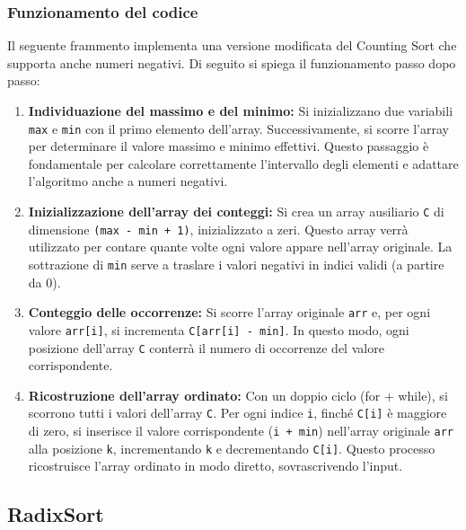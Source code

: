 \documentclass[a4paper, 11pt]{article}
\begin{document}
\subsubsection*{Funzionamento del codice}

Il seguente frammento implementa una versione modificata del Counting Sort che supporta anche numeri negativi. Di seguito si spiega il funzionamento passo dopo passo:

\begin{enumerate}
  \item \textbf{Individuazione del massimo e del minimo:}  
  Si inizializzano due variabili \texttt{max} e \texttt{min} con il primo elemento dell'array. Successivamente, si scorre l'array per determinare il valore massimo e minimo effettivi. Questo passaggio è fondamentale per calcolare correttamente l’intervallo degli elementi e adattare l’algoritmo anche a numeri negativi.

  \item \textbf{Inizializzazione dell’array dei conteggi:}  
  Si crea un array ausiliario \texttt{C} di dimensione \texttt{(max - min + 1)}, inizializzato a zeri. Questo array verrà utilizzato per contare quante volte ogni valore appare nell’array originale. La sottrazione di \texttt{min} serve a traslare i valori negativi in indici validi (a partire da 0).

  \item \textbf{Conteggio delle occorrenze:}  
  Si scorre l’array originale \texttt{arr} e, per ogni valore \texttt{arr[i]}, si incrementa \texttt{C[arr[i] - min]}. In questo modo, ogni posizione dell’array \texttt{C} conterrà il numero di occorrenze del valore corrispondente.

  \item \textbf{Ricostruzione dell’array ordinato:}  
  Con un doppio ciclo (for + while), si scorrono tutti i valori dell’array \texttt{C}. Per ogni indice \texttt{i}, finché \texttt{C[i]} è maggiore di zero, si inserisce il valore corrispondente (\texttt{i + min}) nell’array originale \texttt{arr} alla posizione \texttt{k}, incrementando \texttt{k} e decrementando \texttt{C[i]}. Questo processo ricostruisce l’array ordinato in modo diretto, sovrascrivendo l’input.
\end{enumerate}

\subsection{RadixSort}
\end{document}
